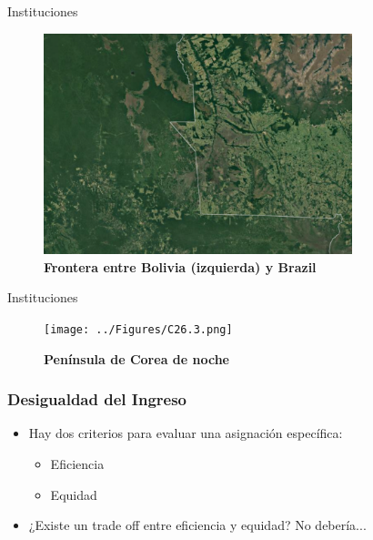 \documentclass{beamer}
\begin{document}
\begin{frame}{Instituciones}
    
    \begin{figure}[H]
        \begin{center}
            \includegraphics[width=0.8\textwidth]{../Figures/C26.2.png}
        \end{center}
        \caption{\textbf{Frontera entre Bolivia (izquierda) y Brazil}}
    \end{figure}
\end{frame}


\begin{frame}{Instituciones}
    \begin{figure}[H]
    \begin{center}
    \texttt{[image: ../Figures/C26.3.png]}
    \end{center}
    \caption{\textbf{Península de Corea de noche}}
    \label{fig:korea}
    \end{figure}
\end{frame}

\begin{frame} 
\frametitle{Desigualdad del Ingreso}
\begin{itemize}
\item Hay dos criterios para evaluar una asignación específica: 
\begin{itemize}
    \item Eficiencia
    \item Equidad
\end{itemize}
\item ¿Existe un trade off entre eficiencia y equidad? No debería...
\end{itemize}
\end{frame}
\end{document}

